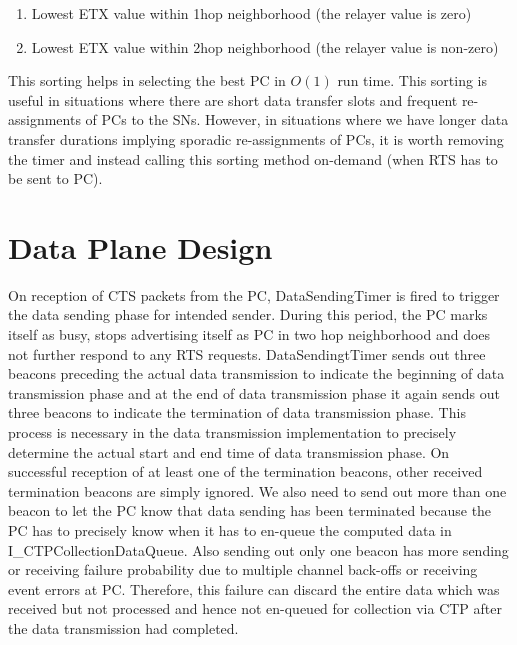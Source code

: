     \begin{enumerate}
        \item Lowest \ac{ETX} value within 1hop neighborhood (the relayer value is zero)
        \item Lowest \ac{ETX} value within 2hop neighborhood (the relayer value is non-zero)
    \end{enumerate}
    
    \par
    This sorting helps in selecting the best \ac{PC} in $O(1)$ run time. This sorting is useful in situations where there are short data transfer slots and frequent re-assignments of \acp{PC} to the \acp{SN}. However, in situations where we have longer data transfer durations implying sporadic re-assignments of \acp{PC}, it is worth removing the timer and instead calling this sorting method on-demand (when \ac{RTS} has to be sent to \ac{PC}).   

\section{Data Plane Design}\label{sec:DataPlaneDesign}

On reception of \ac{CTS} packets from the \ac{PC}, DataSendingTimer is fired to trigger the data sending phase for intended sender. During this period, the \ac{PC} marks itself as busy, stops advertising itself as \ac{PC} in two hop neighborhood and does not further respond to any \ac{RTS} requests. DataSendingtTimer sends out three beacons preceding the actual data transmission to indicate the beginning of data transmission phase and at the end of data transmission phase it again sends out three beacons to indicate the termination of data transmission phase. This process is necessary in the data transmission implementation to precisely determine the actual start and end time of data transmission phase. On successful reception of at least one of the termination beacons, other received termination beacons are simply ignored. We also need to send out more than one beacon to let the \ac{PC} know that data sending has been terminated because the \ac{PC} has to precisely know when it has to en-queue the computed data in I\_CTPCollectionDataQueue. Also sending out only one beacon has more sending or receiving failure probability due to multiple channel back-offs or receiving event errors at \ac{PC}. Therefore, this failure can discard the entire data which was received but not processed and hence not en-queued for collection via \ac{CTP} after the data transmission had completed. 

